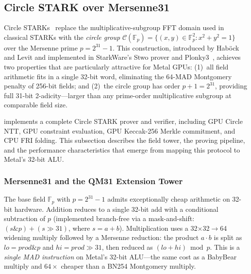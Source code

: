 
\subsection{Circle STARK over Mersenne31}
\label{sec:circle-stark}

Circle STARKs~\cite{circle-stark} replace the multiplicative-subgroup FFT
domain used in classical STARKs with the \emph{circle group}
$\mathcal{C}(\mathbb{F}_p) = \{(x,y) \in \mathbb{F}_p^2 : x^2 + y^2 = 1\}$
over the Mersenne prime $p = 2^{31} - 1$.  This construction, introduced by
Hab\"ock and Levit and implemented in StarkWare's Stwo prover and
Plonky3~\cite{plonky3}, achieves two properties that are particularly
attractive for Metal GPUs: (1)~all field arithmetic fits in a single 32-bit
word, eliminating the 64-MAD Montgomery penalty of 256-bit fields; and
(2)~the circle group has order $p + 1 = 2^{31}$, providing full 31-bit
2-adicity---larger than any prime-order multiplicative subgroup at comparable
field size.

\sys implements a complete Circle STARK prover and verifier, including GPU
Circle NTT, GPU constraint evaluation, GPU Keccak-256 Merkle commitment,
and CPU FRI folding.  This subsection describes the field tower, the
proving pipeline, and the performance characteristics that emerge from
mapping this protocol to Metal's 32-bit ALU.

\subsubsection{Mersenne31 and the QM31 Extension Tower}
\label{sec:m31-tower}

The base field $\mathbb{F}_p$ with $p = 2^{31} - 1$ admits exceptionally
cheap arithmetic on 32-bit hardware.  Addition reduces to a single 32-bit
add with a conditional subtraction of $p$ (implemented branch-free via a
mask-and-shift: $(s \mathbin{\&} p) + (s \gg 31)$, where $s = a + b$).
Multiplication uses a 32$\times$32$\to$64 widening multiply followed by a
Mersenne reduction: the product $a \cdot b$ is split as
$\mathit{lo} = \mathit{prod} \mathbin{\&} p$ and
$\mathit{hi} = \mathit{prod} \gg 31$, then reduced as
$(\mathit{lo} + \mathit{hi}) \bmod p$.  This is a \emph{single MAD
instruction} on Metal's 32-bit ALU---the same cost as a BabyBear multiply
and $64\times$ cheaper than a BN254 Montgomery multiply.

